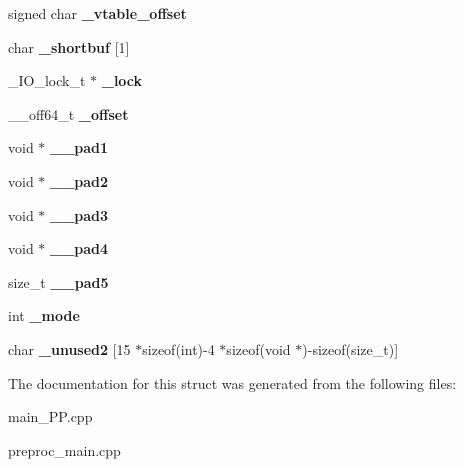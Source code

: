 \begin{DoxyCompactItemize}
\item 
\hypertarget{struct__IO__FILE_ac503f09304dc1fa00d54b97ffcf77afa}{signed char {\bfseries \+\_\+vtable\+\_\+offset}}\label{struct__IO__FILE_ac503f09304dc1fa00d54b97ffcf77afa}

\item 
\hypertarget{struct__IO__FILE_a93a64646816443e509390088d6480844}{char {\bfseries \+\_\+shortbuf} \mbox{[}1\mbox{]}}\label{struct__IO__FILE_a93a64646816443e509390088d6480844}

\item 
\hypertarget{struct__IO__FILE_a41d096a9fa8a41b29ff9ff6044cf012c}{\+\_\+\+I\+O\+\_\+lock\+\_\+t $\ast$ {\bfseries \+\_\+lock}}\label{struct__IO__FILE_a41d096a9fa8a41b29ff9ff6044cf012c}

\item 
\hypertarget{struct__IO__FILE_a6984cd80575532a12da307fd776cbe21}{\+\_\+\+\_\+off64\+\_\+t {\bfseries \+\_\+offset}}\label{struct__IO__FILE_a6984cd80575532a12da307fd776cbe21}

\item 
\hypertarget{struct__IO__FILE_a70aaeef872c441d0d4385c5c6e94f46b}{void $\ast$ {\bfseries \+\_\+\+\_\+pad1}}\label{struct__IO__FILE_a70aaeef872c441d0d4385c5c6e94f46b}

\item 
\hypertarget{struct__IO__FILE_a93aedd4af2259e30013751baca9a1f6c}{void $\ast$ {\bfseries \+\_\+\+\_\+pad2}}\label{struct__IO__FILE_a93aedd4af2259e30013751baca9a1f6c}

\item 
\hypertarget{struct__IO__FILE_a79a75456b7a25cc58d310da2a157f210}{void $\ast$ {\bfseries \+\_\+\+\_\+pad3}}\label{struct__IO__FILE_a79a75456b7a25cc58d310da2a157f210}

\item 
\hypertarget{struct__IO__FILE_a212753c24e72e1a1160c5cd0b5d5a5d2}{void $\ast$ {\bfseries \+\_\+\+\_\+pad4}}\label{struct__IO__FILE_a212753c24e72e1a1160c5cd0b5d5a5d2}

\item 
\hypertarget{struct__IO__FILE_a79b0d0bccbf23ce37069f9a8ca6297fd}{size\+\_\+t {\bfseries \+\_\+\+\_\+pad5}}\label{struct__IO__FILE_a79b0d0bccbf23ce37069f9a8ca6297fd}

\item 
\hypertarget{struct__IO__FILE_a5fcae29efb49dd2d3ea1fcd920daacfd}{int {\bfseries \+\_\+mode}}\label{struct__IO__FILE_a5fcae29efb49dd2d3ea1fcd920daacfd}

\item 
\hypertarget{struct__IO__FILE_add2be926ca3c141f3a2d215f7c52ee18}{char {\bfseries \+\_\+unused2} \mbox{[}15 $\ast$sizeof(int)-\/4 $\ast$sizeof(void $\ast$)-\/sizeof(size\+\_\+t)\mbox{]}}\label{struct__IO__FILE_add2be926ca3c141f3a2d215f7c52ee18}

\end{DoxyCompactItemize}


The documentation for this struct was generated from the following files\+:\begin{DoxyCompactItemize}
\item 
main\+\_\+\+P\+P.\+cpp\item 
preproc\+\_\+main.\+cpp\end{DoxyCompactItemize}
